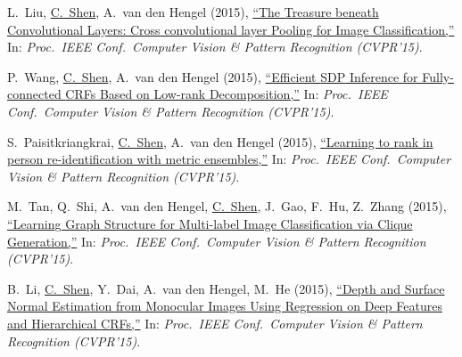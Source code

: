 \documentclass[9pt, a4paper]{article}
\newcommand{\years}[1]{\marginnote{\scriptsize #1}}
\def\highlight{\uline}
\begin{document}
\medskip

\years{2015} L.~Liu, \highlight{C.~Shen}, A.~van den Hengel (2015),
\href{http://www.google.com/search?lr=&ie=UTF-8&oe=UTF-8&q=The+Treasure+beneath+Convolutional+Layers%3A+Cross+convolutional+layer+Pooling+for+Image+Classification+Lingqiao+Liu%2C+Chunhua+Shen%2C+Anton++van+den+Hengel}{``The Treasure beneath Convolutional Layers: Cross convolutional layer Pooling for Image Classification,{}''}
In: \emph{Proc.\ IEEE Conf.\  Computer Vision \& Pattern Recognition (CVPR'15)}.

\medskip

\years{2015} P.~Wang, \highlight{C.~Shen}, A.~van den Hengel (2015),
\href{http://www.google.com/search?lr=&ie=UTF-8&oe=UTF-8&q=Efficient+SDP+Inference+for+Fully-connected+CRFs+Based+on+Low-rank+Decomposition+Peng+Wang%2C+Chunhua+Shen%2C+Anton++van+den+Hengel}{``Efficient {SDP} Inference for Fully-connected {CRFs} Based on Low-rank Decomposition,{}''}
In: \emph{Proc.\ IEEE Conf.\  Computer Vision \& Pattern Recognition (CVPR'15)}.

\medskip

\years{2015} S.~Paisitkriangkrai, \highlight{C.~Shen}, A.~van den Hengel (2015),
\href{http://www.google.com/search?lr=&ie=UTF-8&oe=UTF-8&q=Learning+to+rank+in+person+re-identification+with+metric+ensembles+Sakrapee+Paisitkriangkrai%2C+Chunhua+Shen%2C+Anton++van+den+Hengel}{``Learning to rank in person re-identification with metric ensembles,{}''}
In: \emph{Proc.\ IEEE Conf.\  Computer Vision \& Pattern Recognition (CVPR'15)}.

\medskip

\years{2015} M.~Tan, Q.~Shi, A.~van den Hengel, \highlight{C.~Shen}, J.~Gao, F.~Hu, Z.~Zhang (2015),
\href{http://www.google.com/search?lr=&ie=UTF-8&oe=UTF-8&q=Learning+Graph+Structure+for+Multi-label+Image+Classification+via+Clique+Generation+Mingkui+Tan%2C+Qinfeng+Shi%2C+Anton++van+den+Hengel%2C+Chunhua+Shen%2C+Junbin+Gao%2C+Fuyuan+Hu%2C+Zhen+Zhang}{``Learning Graph Structure for Multi-label Image Classification via Clique Generation,{}''}
In: \emph{Proc.\ IEEE Conf.\  Computer Vision \& Pattern Recognition (CVPR'15)}.

\medskip

\years{2015} B.~Li, \highlight{C.~Shen}, Y.~Dai, A.~van den Hengel, M.~He (2015),
\href{http://www.google.com/search?lr=&ie=UTF-8&oe=UTF-8&q=Depth+and+Surface+Normal+Estimation+from+Monocular+Images+Using+Regression+on+Deep+Features+and+Hierarchical+CRFs+Bo+Li%2C+Chunhua+Shen%2C+Yuchao+Dai%2C+Anton++van+den+Hengel%2C+Mingyi+He}{``Depth and Surface Normal Estimation from Monocular Images Using Regression on Deep Features and Hierarchical {CRFs},{}''}
In: \emph{Proc.\ IEEE Conf.\  Computer Vision \& Pattern Recognition (CVPR'15)}.
\end{document}
